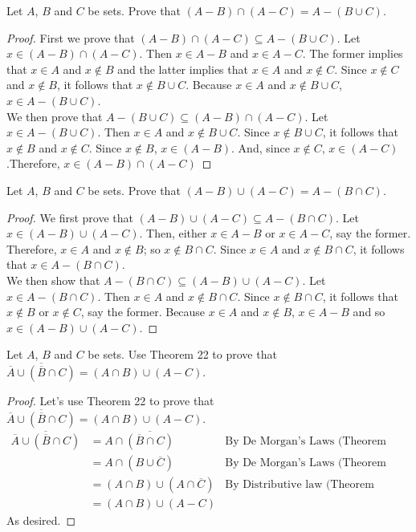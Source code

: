 \documentclass[12pt]{article}
\newenvironment{problem}[2][Problem]{\begin{trivlist}
		\item[\hskip \labelsep {\bfseries #1}\hskip \labelsep {\bfseries #2.}]}{\end{trivlist}}
\begin{document}
	\begin{problem}{55}
		Let $A$, $B$ and $C$ be sets. Prove that $(A-B)\cap (A-C)=A-(B\cup C)$.
		\begin{proof}
			First we prove that $(A-B)\cap(A-C) \subseteq A-(B\cup C)$. Let $x\in (A-B)\cap(A-C)$. Then $x\in A-B$ and $x\in A-C$. The former implies that $x\in A$ and $x\not\in B$ and the latter implies that $x\in A$ and $x\not\in C$. Since $x\not\in C$ and $x\not\in B$, it follows that $x\not\in B\cup C$. Because $x\in A$ and $x\not\in B\cup C$, $x\in A - (B\cup C)$.\\
			
			We then prove that $A-(B\cup C) \subseteq (A-B)\cap(A-C)$. Let $x\in A-(B\cup C)$. Then $x\in A$ and $x\not\in B\cup C$. Since $x\not\in B\cup C$, it follows that $x\not\in B$ and $x\not\in C$. Since $x\not\in B$, $x\in(A-B)$. And, since $x\not\in C$, $x\in(A-C)$.Therefore, $x\in (A-B)\cap(A-C)$
		\end{proof}
	\end{problem}  

	\begin{problem}{56}
			Let $A$, $B$ and $C$ be sets. Prove that $(A-B)\cup (A-C)=A-(B\cap C)$. 
		\begin{proof}
			We first prove that $(A-B)\cup (A-C) \subseteq A-(B\cap C)$. Let $x\in (A-B)\cup (A-C)$. Then, either $x\in A-B$ or $x\in A-C$, say the former. Therefore, $x\in A$ and $x\not\in B$; so $x\not\in B\cap C$. Since  $x\in A$ and $x\not\in B\cap C$, it follows that $x\in A-(B\cap C)$.\\
			
			We then show that $A-(B\cap C) \subseteq (A-B)\cup (A-C)$. Let $x\in A-(B\cap C)$. Then $x\in A$ and $x\not\in B\cap C$. Since $x\not\in B\cap C$, it follows that $x\not\in B$ or $x\not\in C$, say the former. Because $x\in A$ and $x\not\in B$, $x\in A-B$ and so $x\in (A-B)\cup (A-C)$.
		\end{proof}
	\end{problem}

	\begin{problem}{57}
		Let $A$, $B$ and $C$ be sets. Use Theorem 22 to prove that $\overline{\overline{A}\cup (\overline{B}\cap C)} = (A\cap B)\cup (A-C)$.
		\begin{proof}
			Let's use Theorem 22 to prove that $\overline{\overline{A}\cup (\overline{B}\cap C)} = (A\cap B)\cup (A-C)$.
			\begin{align*}
				\overline{\overline{A}\cup (\overline{B}\cap C)} &= A\cap \overline{(\overline{B}\cap C)} 
					&\text{By De Morgan's Laws (Theorem 22 (4))}&\\
				&= A\cap (B\cup \overline{C}) &\text{By De Morgan's Laws (Theorem 22(4))}&\\
				&= (A\cap B)\cup (A\cap \overline{C}) &\text{By Distributive law (Theorem 22(3))}&\\
				&= (A\cap B)\cup (A-C) &&
			\end{align*}
		As desired.
		\end{proof}
	\end{problem}
\end{document}
